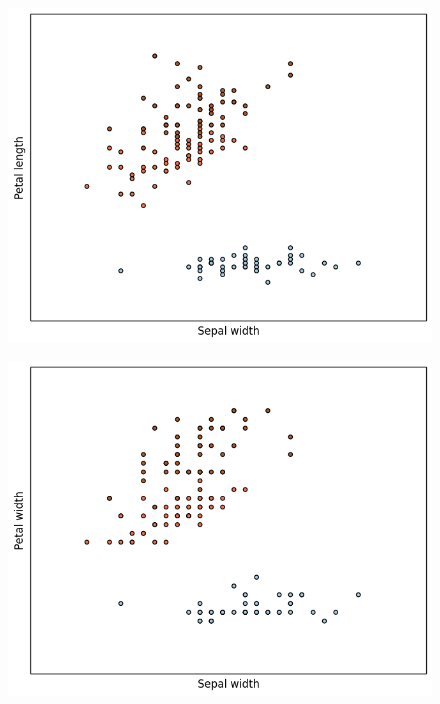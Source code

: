 \documentclass[12pt]{article}
\begin{document}
\begin{figure}[!ht]
\centering
\includegraphics[scale=0.6]{images/sepal_width-petal_length.png}
\end{figure}
\begin{figure}[!ht]
\centering
\includegraphics[scale=0.6]{images/sepal_width-petal_width.png}
\end{figure}

\clearpage


\end{document}
